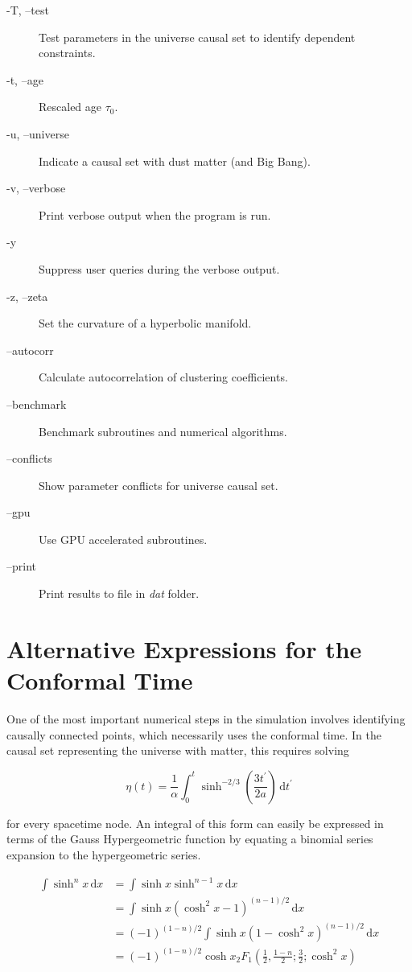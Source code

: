 \documentclass[preprint,notitlepage,amsmath,amssymb,floatfix]{revtex4-1}
\begin{document}
\begin{description}
  \item[-T, --test] \tab Test parameters in the universe causal set to identify dependent constraints.
  \item[-t, --age] \tab Rescaled age $\tau_0$.
  \item[-u, --universe] \tab Indicate a causal set with dust matter (and Big Bang).
  \item[-v, --verbose] \tab Print verbose output when the program is run.
  \item[-y] \tab\tab Suppress user queries during the verbose output.
  \item[-z, --zeta] \tab Set the curvature of a hyperbolic manifold.
  \item[--autocorr] \tab Calculate autocorrelation of clustering coefficients.
  \item[--benchmark] \tab Benchmark subroutines and numerical algorithms.
  \item[--conflicts] \tab Show parameter conflicts for universe causal set.
  \item[--gpu] \tab Use GPU accelerated subroutines.
  \item[--print] \tab Print results to file in \textit{dat} folder.
\end{description}

\section{Alternative Expressions for the Conformal Time}
\label{sec:alt_conformal}
One of the most important numerical steps in the simulation involves identifying causally connected points, which necessarily uses the conformal time.  In the causal set representing the universe with matter, this requires solving

\begin{equation}
\eta\left(t\right) = \frac{1}{\alpha}\int_0^t\!\sinh^{-2/3}\left(\frac{3t^\prime}{2a}\right)\,\mathrm dt^\prime
\end{equation}

\noindent for every spacetime node.  An integral of this form can easily be expressed in terms of the Gauss Hypergeometric function by equating a binomial series expansion to the hypergeometric series.

\begin{equation}
\begin{split}
\int\!\sinh^nx\,\mathrm dx &= \int\!\sinh x\sinh^{n-1}x\,\mathrm dx \\
  &= \int\!\sinh x\left(\cosh^2x-1\right)^{\left(n-1\right)/2}\,\mathrm dx \\
  &= \left(-1\right)^{\left(1-n\right)/2}\int\!\sinh x\left(1-\cosh^2x\right)^{\left(n-1\right)/2}\,\mathrm dx \\
  &= \left(-1\right)^{\left(1-n\right)/2}\cosh x{}_2F_1\left(\frac{1}{2},\frac{1-n}{2};\frac{3}{2};\cosh^2x\right)
\end{split}
\end{equation}
\end{document}
